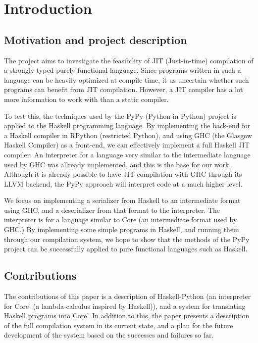 
\chapter{Introduction}

\section{Motivation and project description}

The project aims to investigate the feasibility of JIT (Just-in-time) 
compilation of a strongly-typed purely-functional language. Since
programs written in such a language can be heavily optimized at 
compile time, it us uncertain whether such programs can benefit from
JIT compilation. However, a JIT compiler has a lot more information to
work with than a static compiler. 

To test this, the techniques 
used by the PyPy (Python in Python) project is applied to the Haskell 
programming language. By implementing the back-end for a Haskell compiler 
in RPython (restricted Python), and using GHC (the Glasgow Haskell Compiler) 
as a front-end, we can effectively implement a full Haskell JIT compiler. An 
interpreter for a language very similar to the intermediate language used
by GHC was allready implemented, and this is the base for our work.
Although it is already possible to have JIT compilation with GHC through
its LLVM backend, the PyPy approach will interpret code at a much higher level.

We focus on implementing a serializer from Haskell to an intermediate
format using GHC, and a deserializer from that format to the interpreter. The 
interpreter is for a language similar to Core (an intermediate format used by GHC.)
By implementing some simple programs in Haskell, and running them through our 
compilation system, 
we hope to show that the methods of the PyPy project can be successfully applied 
to pure functional languages such as Haskell.


\section{Contributions}
The contributions of this paper is a description of Haskell-Python (an
interpreter for Core' (a lambda-calculus inspired by Haskell)), and a system for
translating Haskell programs into Core'. In addition to this, the paper 
presents a description of the full compilation system in its current state,
and a plan for the future development of the system based on the 
successes and failures so far.

